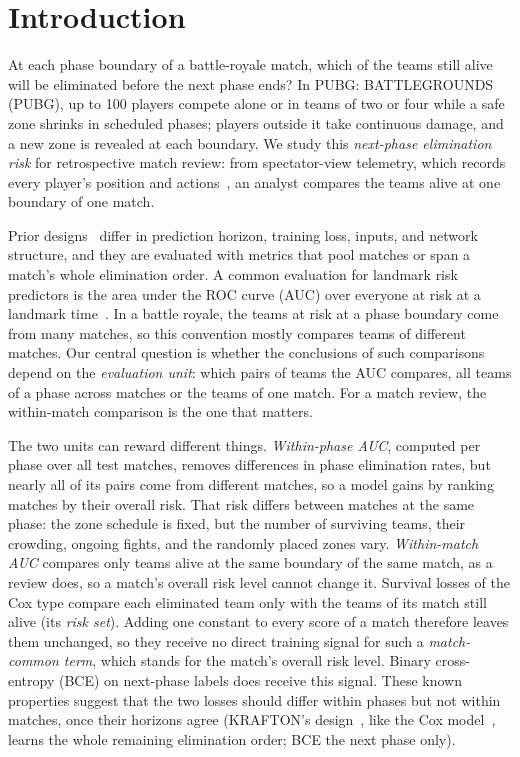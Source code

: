 \documentclass[sigconf,anonymous]{acmart}
\begin{document}
\section{Introduction}
\label{sec:introduction}
At each phase boundary of a battle-royale match, which of the teams still alive will be eliminated before the next phase ends? In PUBG: BATTLEGROUNDS (PUBG), up to 100 players compete alone or in teams of two or four while a safe zone shrinks in scheduled phases; players outside it take continuous damage, and a new zone is revealed at each boundary. We study this \emph{next-phase elimination risk} for retrospective match review: from spectator-view telemetry, which records every player's position and actions~\cite{PUBGAPI}, an analyst compares the teams alive at one boundary of one match.

Prior designs~\cite{Sagong25a,KRAFTON} differ in prediction horizon, training loss, inputs, and network structure, and they are evaluated with metrics that pool matches or span a match's whole elimination order. A common evaluation for landmark risk predictors is the area under the ROC curve (AUC) over everyone at risk at a landmark time~\cite{vanHouwelingen07,HeagertyZheng05}. In a battle royale, the teams at risk at a phase boundary come from many matches, so this convention mostly compares teams of different matches. Our central question is whether the conclusions of such comparisons depend on the \emph{evaluation unit}: which pairs of teams the AUC compares, all teams of a phase across matches or the teams of one match. For a match review, the within-match comparison is the one that matters.

The two units can reward different things. \emph{Within-phase AUC}, computed per phase over all test matches, removes differences in phase elimination rates, but nearly all of its pairs come from different matches, so a model gains by ranking matches by their overall risk. That risk differs between matches at the same phase: the zone schedule is fixed, but the number of surviving teams, their crowding, ongoing fights, and the randomly placed zones vary. \emph{Within-match AUC} compares only teams alive at the same boundary of the same match, as a review does, so a match's overall risk level cannot change it. Survival losses of the Cox type compare each eliminated team only with the teams of its match still alive (its \emph{risk set}). Adding one constant to every score of a match therefore leaves them unchanged, so they receive no direct training signal for such a \emph{match-common term}, which stands for the match's overall risk level. Binary cross-entropy (BCE) on next-phase labels does receive this signal. These known properties suggest that the two losses should differ within phases but not within matches, once their horizons agree (KRAFTON's design~\cite{KRAFTON}, like the Cox model~\cite{Cox72}, learns the whole remaining elimination order; BCE the next phase only).
\end{document}
